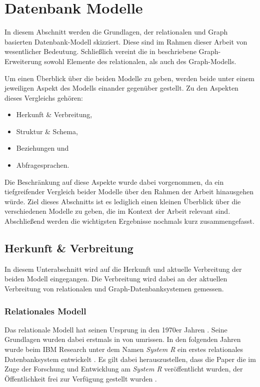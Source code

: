 \section{Datenbank Modelle}
In diesem Abschnitt werden die Grundlagen, der relationalen und Graph basierten Datenbank-Modell skizziert. Diese sind im Rahmen dieser Arbeit von wesentlicher Bedeutung. Schließlich vereint die in  beschriebene Graph-Erweiterung sowohl Elemente des relationalen, als auch des Graph-Modells.

Um einen Überblick über die beiden Modelle zu geben, werden beide unter einem jeweiligen Aspekt des Modells einander gegenüber gestellt. Zu den Aspekten dieses Vergleichs gehören: 

\begin{itemize}
    \item Herkunft \& Verbreitung,
    \item Struktur \& Schema,
    \item Beziehungen und
    \item Abfragesprachen.
\end{itemize}

Die Beschränkung auf diese Aspekte wurde dabei vorgenommen, da ein tiefgreifender Vergleich beider Modelle über den Rahmen der Arbeit hinausgehen würde. Ziel dieses Abschnitts ist es lediglich einen kleinen Überblick über die verschiedenen Modelle zu geben, die im Kontext der Arbeit relevant sind. Abschließend werden die wichtigsten Ergebnisse nochmals kurz zusammengefasst.  

\subsection{Herkunft \& Verbreitung}
In diesem Unterabschnitt wird auf die Herkunft und aktuelle Verbreitung der beiden Modell eingegangen. Die Verbreitung wird dabei an der aktuellen Verbreitung von relationalen und Graph-Datenbanksystemen gemessen. 

\subsubsection{Relationales Modell}
Das relationale Modell hat seinen Ursprung in den 1970er Jahren \cite{rdbms_history}. Seine Grundlagen wurden dabei erstmals in \cite{codd_relational_model} von \citeauthor{codd_relational_model} umrissen. In den folgenden Jahren  wurde beim IBM Research unter dem Namen \textit{System R} ein erstes relationales Datenbanksystem entwickelt \cite{rdbms_history}. Es gilt dabei herauszustellen, dass die Paper die im Zuge der Forschung und Entwicklung am \textit{System R} veröffentlicht wurden, der Öffentlichkeit frei zur Verfügung gestellt wurden \cite{rdbms_history}. 

